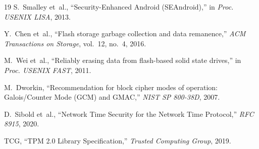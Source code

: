 \documentclass[conference]{IEEEtran}
\begin{document}
\begin{thebibliography}{19}
S.~Smalley et~al., ``Security-Enhanced Android (SEAndroid),'' in \emph{Proc. USENIX LISA}, 2013.

Y.~Chen et~al., ``Flash storage garbage collection and data remanence,'' \emph{ACM Transactions on Storage}, vol.~12, no.~4, 2016.

M.~Wei et~al., ``Reliably erasing data from flash-based solid state drives,'' in \emph{Proc. USENIX FAST}, 2011.

M.~Dworkin, ``Recommendation for block cipher modes of operation: Galois/Counter Mode (GCM) and GMAC,'' \emph{NIST SP 800-38D}, 2007.

D.~Sibold et~al., ``Network Time Security for the Network Time Protocol,'' \emph{RFC 8915}, 2020.

TCG, ``TPM 2.0 Library Specification,'' \emph{Trusted Computing Group}, 2019.
\end{thebibliography}
\end{document}
